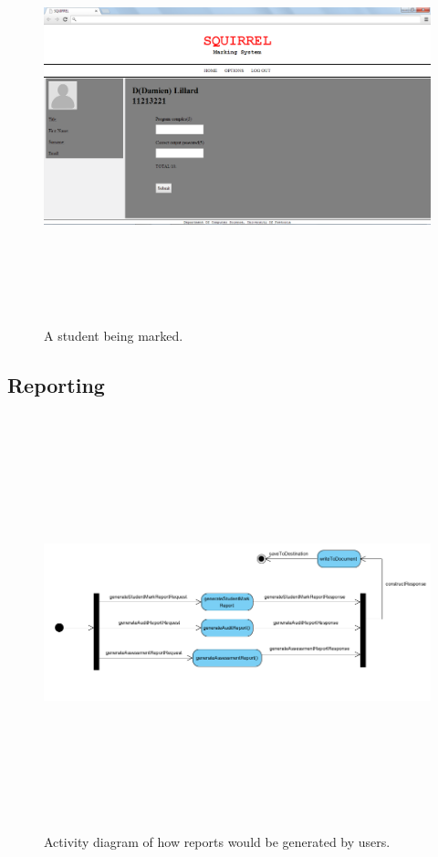 \documentclass[12pt]{article}
\begin{document}
	\pagebreak
		\begin{figure}[htbp]
		\centering
		\includegraphics[width=1.0\linewidth, height=12cm]{./Diagrams/web_markStudent}
		\caption{A student being marked.}
		\label{fig:web_markStudent}
		\end{figure}
	
	\pagebreak
	\newpage
	\subsection{Reporting}
	
		\begin{figure}[htbp]
		\centering
		\includegraphics[width=1.0\linewidth, height=12cm]{./Diagrams/uml_reportGenerating}
		\caption{Activity diagram of how reports would be generated by users.}
		\label{fig:uml_reportGenerating}
		\end{figure}
		
\end{document}
